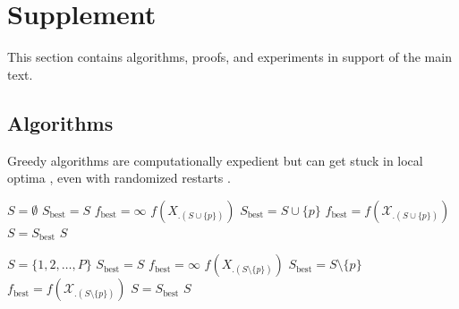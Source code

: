\section{Supplement}

This section contains algorithms, proofs, and experiments in support of the main text.

\subsection{Algorithms}
\label{sec:algorithms}

Greedy algorithms are computationally expedient but can get stuck in local optima \citep{Cormen, Russell-09}, even with randomized restarts \citep{Dick2014HowMR}.

\begin{algorithm}[H]
\caption{\greedy(Matrix ${X} \in \mathbb{R}^{D \times P}$, objective $f$)}
\begin{algorithmic}[1]
 $S = \emptyset$
     $S_{\text{best}} = S$
     $f_{\text{best}} = \infty$
         $f({X}_{.(S \cup \{p\})})$
             $S_{\text{best}} = S \cup \{p\}$
             $f_{\text{best}} = f(\mathcal{X}_{.(S \cup \{p\})})$
        \ENDIF
    \ENDFOR
     $S = S_{\text{best}}$
\ENDWHILE
{} $S$
\end{algorithmic}
\end{algorithm}

\begin{algorithm}[H]
\caption{\backwardgreedy(Matrix ${X} \in \mathbb{R}^{D \times P}$, objective $f$)}
\begin{algorithmic}[1]
 $S = \{1, 2, \dots, P\}$
     $S_{\text{best}} = S$
     $f_{\text{best}} = \infty$
         $f({X}_{.(S \setminus \{p\})})$
             $S_{\text{best}} = S \setminus \{p\}$
             $f_{\text{best}} = f(\mathcal{X}_{.(S \setminus \{p\})})$
        \ENDIF
    \ENDFOR
     $S = S_{\text{best}}$
\ENDWHILE
{} $S$
\end{algorithmic}
\end{algorithm}

